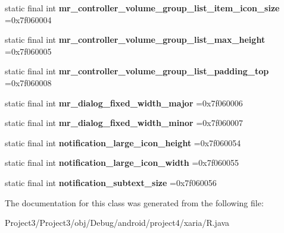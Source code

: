 \begin{DoxyCompactItemize}
\item 
\mbox{\label{classproject4_1_1xaria_1_1R_1_1dimen_a906093b3811e8a5dd9c3126805d0fba8}} 
static final int {\bfseries mr\+\_\+controller\+\_\+volume\+\_\+group\+\_\+list\+\_\+item\+\_\+icon\+\_\+size} =0x7f060004
\item 
\mbox{\label{classproject4_1_1xaria_1_1R_1_1dimen_a979e93e83523485e96a959dfe6f6f789}} 
static final int {\bfseries mr\+\_\+controller\+\_\+volume\+\_\+group\+\_\+list\+\_\+max\+\_\+height} =0x7f060005
\item 
\mbox{\label{classproject4_1_1xaria_1_1R_1_1dimen_a90a1585c0011d564a9a50d3aaedbbb75}} 
static final int {\bfseries mr\+\_\+controller\+\_\+volume\+\_\+group\+\_\+list\+\_\+padding\+\_\+top} =0x7f060008
\item 
\mbox{\label{classproject4_1_1xaria_1_1R_1_1dimen_a3fb7040497074d46408796f46341dc39}} 
static final int {\bfseries mr\+\_\+dialog\+\_\+fixed\+\_\+width\+\_\+major} =0x7f060006
\item 
\mbox{\label{classproject4_1_1xaria_1_1R_1_1dimen_a36afda91fdf0e745b6a2608005f80399}} 
static final int {\bfseries mr\+\_\+dialog\+\_\+fixed\+\_\+width\+\_\+minor} =0x7f060007
\item 
\mbox{\label{classproject4_1_1xaria_1_1R_1_1dimen_aaa2c541eb61709c905f14d7108cff01a}} 
static final int {\bfseries notification\+\_\+large\+\_\+icon\+\_\+height} =0x7f060054
\item 
\mbox{\label{classproject4_1_1xaria_1_1R_1_1dimen_a494b06da494c32841a5c32b235bdcfbb}} 
static final int {\bfseries notification\+\_\+large\+\_\+icon\+\_\+width} =0x7f060055
\item 
\mbox{\label{classproject4_1_1xaria_1_1R_1_1dimen_a83761585c3bea3c24985270bc2217c5a}} 
static final int {\bfseries notification\+\_\+subtext\+\_\+size} =0x7f060056
\end{DoxyCompactItemize}


The documentation for this class was generated from the following file\+:\begin{DoxyCompactItemize}
\item 
Project3/\+Project3/obj/\+Debug/android/project4/xaria/R.\+java\end{DoxyCompactItemize}
